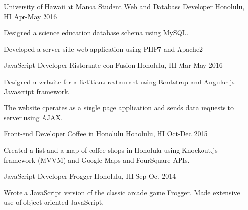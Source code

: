 \begin{cventries}
  \cventry
      {University of Hawaii at Manoa}
      {Student Web and Database Developer}
      {Honolulu, HI}
      {Apr-May 2016}
      {
      	\begin{cvitems}
      		\item {Designed a science education database schema using MySQL.}
      		\item {Developed a server-side web application using PHP7 and Apache2}
      	\end{cvitems}
      }
            \cventry
            {JavaScript Developer}
            {Ristorante con Fusion}
            {Honolulu, HI}
            {Mar-May 2016}
            {\begin{cvitems}
            		\item {Designed a website for a fictitious restaurant using Bootstrap and Angular.js Javascript framework.}
            		\item {The website operates as a single page application and sends data requests to server using AJAX.} %
            	\end{cvitems}
            } 
                  \cventry
                  {Front-end Developer}
                  {Coffee in Honolulu}
                  {Honolulu, HI}
                  {Oct-Dec 2015}
                  {\begin{cvitems}
                  		\item {Created a list and a map of coffee shops in Honolulu using Knockout.js framework (MVVM) and Google Maps and FourSquare APIs.}
                  \end{cvitems}
                  }
      \cventry
      {JavaScript Developer}
      {Frogger}
      {Honolulu, HI}
      {Sep-Oct 2014}
      {\begin{cvitems}
      		\item {Wrote a JavaScript version of the classic arcade game Frogger. Made extensive use of object oriented JavaScript.}
      \end{cvitems}
      }
      

            
      

\end{cventries}
